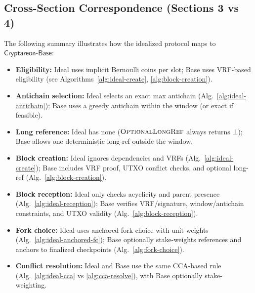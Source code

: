 \documentclass[11pt]{article}
\newcommand{\ProjBase}{\ensuremath{\mathsf{Cryptareon\text{-}Base}}\xspace}
\newcommand{\OptionalLongRef}{\textsc{OptionalLongRef}\xspace}
\begin{document}
\subsection{Cross-Section Correspondence (Sections 3 vs 4)}
The following summary illustrates how the idealized protocol maps to \ProjBase:
\begin{itemize}
  \item \textbf{Eligibility:} Ideal uses implicit Bernoulli coins per slot; Base uses VRF-based eligibility (see Algorithms~\ref{alg:ideal-create}, \ref{alg:block-creation}).
  \item \textbf{Antichain selection:} Ideal selects an exact max antichain (Alg.~\ref{alg:ideal-antichain}); Base uses a greedy antichain within the window (or exact if feasible).
  \item \textbf{Long reference:} Ideal has none ($\OptionalLongRef$ always returns $\bot$); Base allows one deterministic long-ref outside the window.
  \item \textbf{Block creation:} Ideal ignores dependencies and VRFs (Alg.~\ref{alg:ideal-create}); Base includes VRF proof, UTXO conflict checks, and optional long-ref (Alg.~\ref{alg:block-creation}).
  \item \textbf{Block reception:} Ideal only checks acyclicity and parent presence (Alg.~\ref{alg:ideal-reception}); Base verifies VRF/signature, window/antichain constraints, and UTXO validity (Alg.~\ref{alg:block-reception}).
  \item \textbf{Fork choice:} Ideal uses anchored fork choice with unit weights (Alg.~\ref{alg:ideal-anchored-fc}); Base optionally stake-weights references and anchors to finalized checkpoints (Alg.~\ref{alg:fork-choice}).
  \item \textbf{Conflict resolution:} Ideal and Base use the same CCA-based rule (Alg.~\ref{alg:ideal-cca} vs \ref{alg:cca-resolve}), with Base optionally stake-weighting.
\end{itemize}













\appendix
\end{document}
